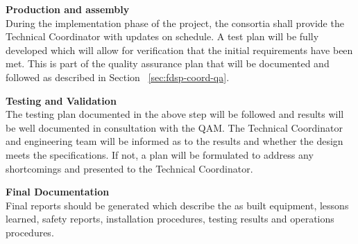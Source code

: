 {\bf Production and assembly}\\ During the implementation phase of the project,
the consortia shall provide the Technical Coordinator with updates on
schedule.  A test plan will be fully developed which will allow for
verification that the initial requirements have been met. This is part of
the quality assurance plan that will be documented and followed as described
in Section ~\ref{sec:fdsp-coord-qa}.

{\bf Testing and Validation\\} The testing plan documented in the
above step will be followed and results will be well documented in
consultation with the QAM.  The Technical Coordinator and engineering
team will be informed as to the results and whether the design meets
the specifications.  If not, a plan will be formulated to address any
shortcomings and presented to the Technical Coordinator.

{\bf Final Documentation\\} Final reports should be generated which
describe the as built equipment, lessons learned, safety reports,
installation procedures, testing results and operations procedures.
